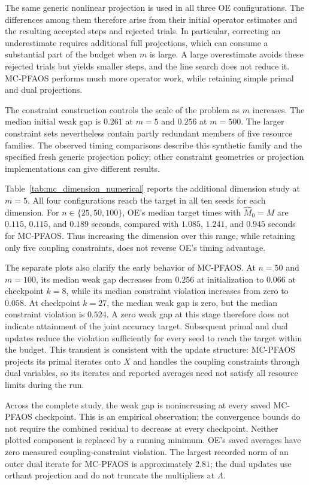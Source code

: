 The same generic nonlinear projection is used in all three OE configurations.
The differences among them therefore arise from their initial operator
estimates and the resulting accepted steps and rejected trials. In
particular, correcting an underestimate requires additional full projections,
which can consume a substantial part of the budget when $m$ is large.
A large overestimate avoids these rejected trials but yields smaller steps,
and the line search does not reduce it. MC-PFAOS performs much more operator
work, while retaining simple primal and dual projections.

The constraint construction controls the scale of the problem as $m$
increases. The median initial weak gap is $0.261$ at $m=5$ and $0.256$
at $m=500$. The larger constraint sets nevertheless contain partly redundant
members of five resource families. The observed timing comparisons describe
this synthetic family and the specified fresh generic projection policy;
other constraint geometries or projection implementations can give different
results.

Table~\ref{tab:mc_dimension_numerical} reports the additional
dimension study at $m=5$. All four configurations reach the target in all ten
seeds for each dimension. For $n\in\{25,50,100\}$, OE's median target
times with $\widehat M_0=M$ are $0.115$, $0.115$, and $0.189$ seconds,
compared with $1.085$, $1.241$, and $0.945$ seconds for MC-PFAOS. Thus increasing
the dimension over this range, while retaining only five coupling
constraints, does not reverse OE's timing advantage.



The separate plots also clarify the early behavior of MC-PFAOS. At
$n=50$ and $m=100$, its median weak gap decreases from $0.256$ at
initialization to $0.066$ at checkpoint $k=8$, while its median
constraint violation increases from zero to $0.058$. At checkpoint
$k=27$, the median weak gap is zero, but the median constraint violation
is $0.524$. A zero weak gap at this stage therefore does not indicate
attainment of the joint accuracy target. Subsequent primal and dual
updates reduce the violation sufficiently for every seed to reach the
target within the budget. This transient is consistent with the update
structure: MC-PFAOS projects its primal iterates onto $X$ and handles
the coupling constraints through dual variables, so its iterates and
reported averages need not satisfy all resource limits during the run.

Across the complete study, the weak gap is nonincreasing at every saved
MC-PFAOS checkpoint. This is an empirical observation; the convergence
bounds do not require the combined residual to decrease at every
checkpoint. Neither plotted component is replaced by a running minimum.
OE's saved averages have zero measured coupling-constraint violation.
The largest recorded norm of an outer dual iterate for MC-PFAOS is
approximately $2.81$; the dual updates use orthant projection and do
not truncate the multipliers at $\Lambda$.
